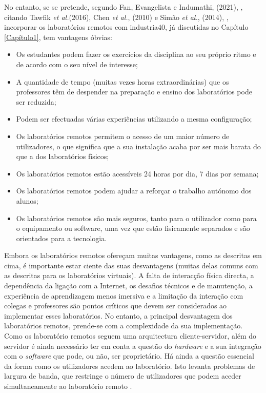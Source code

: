 No entanto, se se pretende, segundo Fan, Evangelista e Indumathi, (2021), \cite{EvaluationRemoteVirtualE-Learning}, citando Tawfik \textit{et al.}(2016)\cite{RemoteLabsImpactVISIR}, Chen \textit{et al.}, (2010)\cite{DevelopingVirtualAndRemoteUndergraduate} e Simão \textit{et al.}, (2014), \cite{RemoteLabsDevelopingCountries}, incorporar os laboratórios remotos com \gls{industria40}, já discutidas no Capítulo \ref{Capítulo1}, tem vantagens óbvias:
\begin{itemize}
    \item Os estudantes podem fazer os exercícios da disciplina ao seu próprio ritmo e de acordo com o seu nível de interesse;
    \item A quantidade de tempo (muitas vezes horas extraordinárias) que os professores têm de despender na preparação e ensino dos laboratórios pode ser reduzida;
    \item Podem ser efectuadas várias experiências utilizando a mesma configuração;
    \item Os laboratórios remotos permitem o acesso de um maior número de utilizadores, o que significa que a sua instalação acaba por ser mais barata do que a dos laboratórios físicos;
    \item Os laboratórios remotos estão acessíveis 24 horas por dia, 7 dias por semana;
    \item Os laboratórios remotos podem ajudar a reforçar o trabalho autónomo dos alunos;
    \item Os laboratórios remotos são mais seguros, tanto para o utilizador como para o equipamento ou software, uma vez que estão fisicamente separados e são orientados para a tecnologia.
\end{itemize}

Embora os laboratórios remotos ofereçam muitas vantagens, como as descritas em cima, é importante estar ciente das suas desvantagens (muitas delas comuns com as descritas para os laboratórios virtuais). A falta de interacção física directa, a dependência da ligação com a Internet, os desafios técnicos e de manutenção, a experiência de aprendizagem menos imersiva e a limitação da interação com colegas e professores são pontos críticos que devem ser considerados ao implementar esses laboratórios. No entanto, a principal desvantagem dos laboratórios remotos, prende-se com a complexidade da sua implementação. Como os \acrshort{laboratório remoto}s seguem uma arquitectura cliente-servidor, além do servidor é ainda necessário ter em conta a questão do \textit{hardware} e a sua integração com o \textit{software} que pode, ou não, ser proprietário. Há ainda a questão essencial da forma como os utilizadores acedem ao laboratório. Isto levanta problemas de largura de banda, que restringe o número de utilizadores que podem aceder simultaneamente ao \acrshort{laboratório remoto} \cite{HERADIO20161}.

